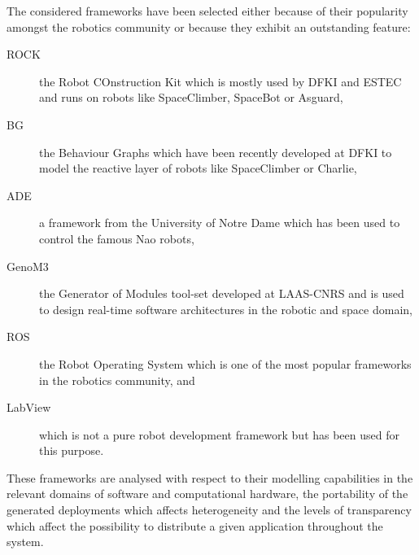\documentclass[a4paper,twocolumn]{esapub2005} %
\begin{document}
The considered frameworks have been selected either because of their popularity amongst the robotics community or because they exhibit an outstanding feature:
\begin{description}
    \item[ROCK] the Robot COnstruction Kit which is mostly used by DFKI and ESTEC and runs on robots like SpaceClimber, SpaceBot or Asguard\cite{ROCK},
    \item[BG] the Behaviour Graphs which have been recently developed at DFKI to model the reactive layer of robots like SpaceClimber or Charlie\cite{2012_Langosz},
    \item[ADE] a framework from the University of Notre Dame which has been used to control the famous Nao robots\cite{Scheutz},
    \item[GenoM3] the Generator of Modules tool-set developed at LAAS-CNRS and is used to design real-time software architectures in the robotic and space domain\cite{2015_Genom3},
    \item[ROS] the Robot Operating System which is one of the most popular frameworks in the robotics community\cite{ROS}, and
    \item[LabView] which is not a pure robot development framework but has been used for this purpose\cite{2010_Muecke}.
\end{description}
These frameworks are analysed with respect to their modelling capabilities in the relevant domains of software and computational hardware, the portability of the generated deployments which affects heterogeneity and the levels of transparency which affect the possibility to distribute a given application throughout the system.

\end{document}
